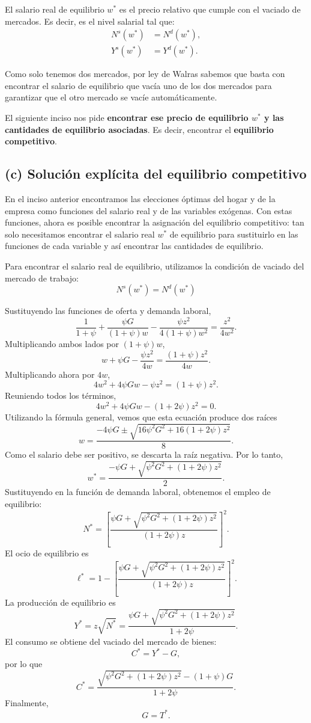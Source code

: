 \documentclass[11pt]{article}
\begin{document}
El salario real de equilibrio \(w^*\) es el precio relativo que cumple con el vaciado de mercados. Es decir, es el nivel salarial tal que:
\begin{align*}
  N^s(w^*)&=N^d(w^*), \\
  Y^s(w^*)&=Y^d(w^*).
\end{align*}

Como solo tenemos dos mercados, por ley de Walras sabemos que basta con encontrar el salario de equilibrio que vacía uno de los dos mercados para garantizar que el otro mercado se vacíe automáticamente. 

El siguiente inciso nos pide \textbf{encontrar ese precio de equilibrio $w^*$ y las cantidades de equilibrio asociadas}. Es decir, encontrar el \textbf{equilibrio competitivo}.



\subsection*{(c) Solución explícita del equilibrio competitivo}
En el inciso anterior encontramos las elecciones óptimas del hogar y de la empresa como funciones del salario real y de las variables exógenas. Con estas funciones, ahora es posible encontrar la asignación del equilibrio competitivo: tan solo necesitamos encontrar el salario real $w^*$ de equilibrio para sustituirlo en las funciones de cada variable y así encontrar las cantidades de equilibrio.

Para encontrar el salario real de equilibrio, utilizamos la condición de vaciado del mercado de trabajo:
$$
N^s(w^*) = N^d(w^*)
$$

Sustituyendo las funciones de oferta y demanda laboral,
\[
  \frac{1}{1+\psi}+\frac{\psi G}{(1+\psi)w}-\frac{\psi z^2}{4(1+\psi)w^2}
  =\frac{z^2}{4w^2}.
\]
Multiplicando ambos lados por $(1+\psi)w$,
\[
  w + \psi G -\frac{\psi z^2}{4w}
  =\frac{(1+\psi)z^2}{4w}.
\]
Multiplicando ahora por $4w$,
\[
  4w^2 + 4\psi Gw - \psi z^2 = (1+\psi)z^2.
\]
Reuniendo todos los términos,
\[
  4w^2+4\psi Gw-(1+2\psi)z^2=0.
\]
Utilizando la fórmula general, vemos que esta ecuación produce dos raíces
\[
  w
  =\frac{-4\psi G\pm
  \sqrt{16\psi^2G^2+16(1+2\psi)z^2}}{8}.
\]
Como el salario debe ser positivo, se descarta la raíz negativa. Por lo tanto,
\[
  \boxed{
  w^*
  =\frac{-\psi G+\sqrt{\psi^2G^2+(1+2\psi)z^2}}{2}
  }.
\]
Sustituyendo en la función de demanda laboral, obtenemos el empleo de equilibrio:
\[
  \boxed{
  N^*
  =\left[
  \frac{\psi G+\sqrt{\psi^2G^2+(1+2\psi)z^2}}
  {(1+2\psi)z}
  \right]^2
  }.
\]
El ocio de equilibrio es
\[
  \boxed{
  \ell^*
  =1-\left[
  \frac{\psi G+\sqrt{\psi^2G^2+(1+2\psi)z^2}}
  {(1+2\psi)z}
  \right]^2
  }.
\]
La producción de equilibrio es
\[
  Y^*=z\sqrt{N^*}
  =\boxed{
  \frac{\psi G+\sqrt{\psi^2G^2+(1+2\psi)z^2}}
  {1+2\psi}
  }.
\]
El consumo se obtiene del vaciado del mercado de bienes:
\[
  C^*=Y^*-G,
\]
por lo que
\[
  \boxed{
  C^*
  =\frac{\sqrt{\psi^2G^2+(1+2\psi)z^2}-(1+\psi)G}
  {1+2\psi}
  }.
\]
Finalmente,
\[
  \boxed{G = T^*}.
\]
\end{document}

